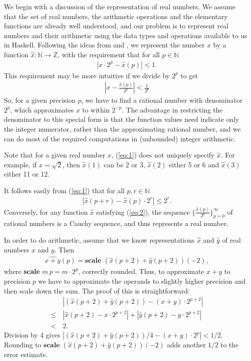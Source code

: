 \documentclass[9pt, a4, twocolumn]{article}
\begin{document}
We begin with a discussion of the representation of real
numbers. We assume that the set of real
numbers, the arithmetic operations and the elementary functions are already well understood,
and our problem is to represent real numbers and their arithmetic 
using the data types and operations available
to us in Haskell.  Following the ideas from \cite{boehm} and \cite{Lester2011}, we represent the
number $x$ by a function $\hat{x} : \mathbb{N} \rightarrow \mathbb{Z}$,
with the requirement that for all $p \in \mathbb{N}$
\begin{align}
  \label{eq:1}
|x \cdot 2^p - \hat{x}(p)| < 1.  
\end{align}
This requirement may be more intuitive if we divide by $2^p$ to get
\begin{align*}
 |x - \frac{\hat{x}(p)}{2^p}| < \frac{1}{2^p}
\end{align*}
So, for a given precision $p$, we have to find a rational number with
denominator $2^p$, which approximates $x$ to within $2^{-p}$. The
advantage in restricting the denominator to this special form is that
the function values need indicate only the
integer numerator, rather than the approximating rational number, and we
can do most of the required computations in (unbounded) integer arithmetic.

Note that for a given real number $x$, (\ref{eq:1}) does not
uniquely specify $\hat{x}$. For example, if $x = \sqrt{2}$, then $\hat{x}(1)$
can be 2 or 3,   $\hat{x}(2)$ either 5 or 6 and  $\hat{x}(3)$ either
11 or 12.

It follows easily from (\ref{eq:1}) that for all $p, r \in
\mathbb{N}$
\begin{align}
  \label{eq:2}
  |\hat{x} (p+r) - \hat{x} (p) \cdot 2^r| \leq 2^r.
\end{align}
Conversely, for any function $\hat{x}$ satisfying (\ref{eq:2}), the sequence
$\{\frac{\hat{x} (p)}{2^p}\}_{p=0}^\infty$  of rational numbers is a Cauchy
sequence, and thus represents a real number.

In order to do arithmetic, assume that we know representations
$\hat{x}$ and $\hat{y}$ of real numbers $x$ and $y$. Then 
\begin{align*}
\widehat{x+y}(p) = \textbf{scale } (\hat{x}(p+2) + \hat{y}(p+2)) (-2),  
\end{align*}
where \textbf{scale} $m \, p = m \cdot 2^p$, correctly rounded.
 Thus, to approximate $x+y$ to precision $p$ we have to approximate the
operands to slightly higher precision and then scale down the sum. The
proof of this is straightforward:
\begin{align*}
   & \, |(\hat{x}(p+2) + \hat{y}(p+2)) - (x+y) \cdot 2^{p+2}| \\
   \leq & \, |\hat{x}(p+2)- x \cdot 2^{p+2}| +  |\hat{y}(p+2) - y \cdot 2^{p+2}| \\
   < & \, 2.
\end{align*}
Division by 4 gives  $|(\hat{x}(p+2) + \hat{y}(p+2))/4 - (x+y) \cdot 2^p| < 1/2$.
Rounding to $\textbf{scale }(\hat{x}(p+2) + \hat{y}(p+2)) (-2)$ adds
another $1/2$ to the error estimate.
\end{document}
